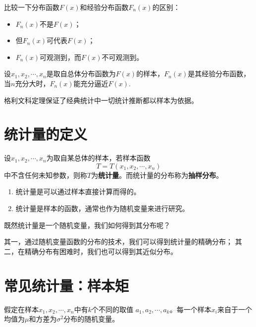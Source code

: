 比较一下分布函数$F(x)$和经验分布函数$F_n(x)$的区别：
\begin{itemize}
  \item $F_{n}(x)$不是$F(x)$；
\item 但$F_{n}(x)$可代表$F(x)$；
\item $F_{n}(x)$可观测到，而$F(x)$不可观测到。
\end{itemize}


\begin{theorem}[格利文科定理]
设$x_{1},x_{2},\cdots,x_{n}$是取自总体分布函数为$F(x)$的样本，$F_{n}(x)$是其经验分布函数，当$n$充分大时，$F_{n}(x)$能充分逼近$F(x)$.
\end{theorem}

\begin{remark}
  格利文科定理保证了经典统计中一切统计推断都以样本为依据。  
\end{remark}
\section{统计量的定义}
\begin{definition}[统计量]
    设$x_1,x_2,\cdots,x_n$为取自某总体的样本，若样本函数
    $$
    T = T(x_1,x_2,\cdots,x_n)
    $$
    中不含任何未知参数，则称$T$为\textbf{统计量}。而统计量的分布称为\textbf{抽样分布}。
\end{definition}
\begin{remark}
\begin{enumerate}
    \item  统计量是可以通过样本直接计算而得的。
    \item 统计量是样本的函数，通常也作为随机变量来进行研究。
\end{enumerate}
\end{remark}
\begin{problem}
    既然统计量是一个随机变量，我们如何得到其分布呢？
\end{problem}
\begin{solution}
    其一，通过随机变量函数的分布的技术，我们可以得到统计量的精确分布；
    其二，在精确分布有困难时，我们也可以得到其近似分布。
\end{solution}

\newpage
\section{常见统计量：样本矩}
假定在样本$x_1,x_2,\cdots,x_n$中有$k$个不同的取值
$a_1,a_2,\cdots,a_k$。每一个样本$x_i$来自于一个均值为$\mu$和方差为$\sigma^2$分布的随机变量。

